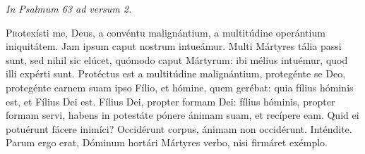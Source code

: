 
{\hfill \textit{In Psalmum 63 ad versum 2.}}

\lettrine{P}{r}otexísti me, Deus, a convéntu malignántium, a multitúdine operántium iniquitátem. Jam ipsum caput nostrum intueámur. Multi Mártyres tália passi sunt, sed nihil sic elúcet, quómodo caput Mártyrum: ibi mélius intuémur, quod illi expérti sunt. Protéctus est a multitúdine malignántium, protegénte se Deo, protegénte carnem suam ipso Fílio, et hómine, quem gerébat: quia fílius hóminis est, et Fílius Dei est. Fílius Dei, propter formam Dei: fílius hóminis, propter formam servi, habens in potestáte pónere ánimam suam, et recípere eam. Quid ei potuérunt fácere inimíci? Occidérunt corpus, ánimam non occidérunt. Inténdite. Parum ergo erat, Dóminum hortári Mártyres verbo, nisi firmáret exémplo.